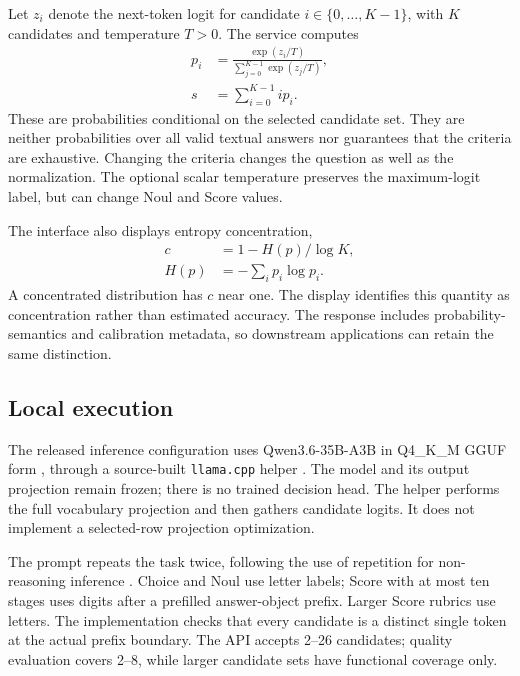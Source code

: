 \documentclass[11pt]{article}
\begin{document}
Let $z_i$ denote the next-token logit for candidate $i\in\{0,\ldots,K-1\}$, with $K$ candidates and temperature $T>0$. The service computes
\begin{equation}
\begin{aligned}
 p_i &= \frac{\exp(z_i/T)}{\sum_{j=0}^{K-1}\exp(z_j/T)},\\
 s &= \sum_{i=0}^{K-1} i p_i.
\end{aligned}
\end{equation}
These are probabilities conditional on the selected candidate set. They are neither probabilities over all valid textual answers nor guarantees that the criteria are exhaustive. Changing the criteria changes the question as well as the normalization. The optional scalar temperature preserves the maximum-logit label, but can change Noul and Score values.

The interface also displays entropy concentration,
\begin{equation}
\begin{aligned}
 c &= 1 - H(p)/\log K,\\
 H(p) &= -\sum_i p_i\log p_i.
\end{aligned}
\end{equation}
A concentrated distribution has $c$ near one. The display identifies this quantity as concentration rather than estimated accuracy. The response includes probability-semantics and calibration metadata, so downstream applications can retain the same distinction.

\subsection{Local execution}
The released inference configuration uses Qwen3.6-35B-A3B in Q4\_K\_M GGUF form \citep{qwen36,qwen36gguf}, through a source-built \texttt{llama.cpp} helper \citep{llamacpp}. The model and its output projection remain frozen; there is no trained decision head. The helper performs the full vocabulary projection and then gathers candidate logits. It does not implement a selected-row projection optimization.

The prompt repeats the task twice, following the use of repetition for non-reasoning inference \citep{leviathan2025repetition}. Choice and Noul use letter labels; Score with at most ten stages uses digits after a prefilled answer-object prefix. Larger Score rubrics use letters. The implementation checks that every candidate is a distinct single token at the actual prefix boundary. The API accepts 2--26 candidates; quality evaluation covers 2--8, while larger candidate sets have functional coverage only.
\end{document}
